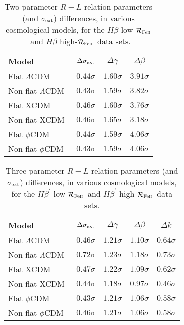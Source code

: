 \documentclass[a4paper,fleqn,usenatbib]{mnras}
\newcommand{\lcdm}{$\Lambda$CDM}
\newcommand{\rfe}{${\cal R}_{\rm{Fe\textsc{ii}}}$}
\begin{document}
\begin{table}
\begin{threeparttable}
\caption{Two-parameter $R-L$ relation parameters (and $\sigma_{\rm ext}$) differences, in various cosmological models, for the $H\beta$ low-\rfe\ and $H\beta$ high-\rfe\ data sets.}
\label{tab:comp1}
\setlength{\tabcolsep}{14.5pt}
\begin{tabular}{lccc}
\hline
Model & $\Delta \sigma_{\rm ext}$  & $\Delta \gamma$  & $\Delta \beta$\\
\hline
Flat \lcdm\  & $0.44\sigma$ & $1.60\sigma$ & $3.91\sigma$\\
Non-flat \lcdm\ & $0.43\sigma$ & $1.59\sigma$ & $3.82\sigma$ \\
Flat XCDM  & $0.46\sigma$ & $1.60\sigma$ & $3.76\sigma$\\
Non-flat XCDM  & $0.46\sigma$ & $1.65\sigma$ & $3.18\sigma$\\
Flat $\phi$CDM  & $0.44\sigma$ & $1.59\sigma$ & $4.06\sigma$\\
Non-flat $\phi$CDM & $0.43\sigma$ & $1.59\sigma$ & $4.06\sigma$\\
\hline
\end{tabular}
\end{threeparttable}
\end{table}

\begin{table}
\begin{threeparttable}
\caption{Three-parameter $R-L$ relation parameters (and $\sigma_{\rm ext}$) differences, in various cosmological models, for the $H\beta^{\prime}$ low-\rfe\ and $H\beta^{\prime}$ high-\rfe\ data sets.}
\label{tab:comp2}
\setlength{\tabcolsep}{10pt}
\begin{tabular}{lcccc}
\hline
Model & $\Delta \sigma_{\rm ext}$  & $\Delta \gamma$  & $\Delta \beta$ & $\Delta k$\\
\hline
Flat \lcdm\  & $0.46\sigma$ & $1.21\sigma$ & $1.10\sigma$ & $0.64\sigma$\\
Non-flat \lcdm\ & $0.72\sigma$ & $1.23\sigma$ & $1.18\sigma$ & $0.73\sigma$ \\
Flat XCDM  & $0.47\sigma$ & $1.22\sigma$ & $1.09\sigma$ & $0.62\sigma$\\
Non-flat XCDM  & $0.44\sigma$ & $1.18\sigma$ & $0.97\sigma$ & $0.46\sigma$\\
Flat $\phi$CDM  & $0.43\sigma$ & $1.21\sigma$ & $1.06\sigma$ & $0.58\sigma$\\
Non-flat $\phi$CDM & $0.46\sigma$ & $1.21\sigma$ & $1.06\sigma$ & $0.58\sigma$\\
\hline
\end{tabular}
\end{threeparttable}
\end{table}
\end{document}
